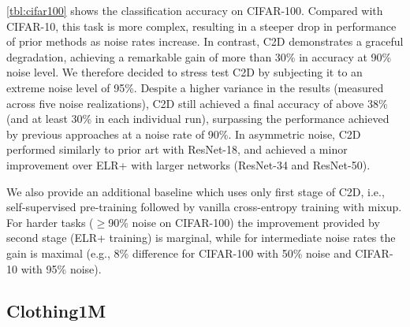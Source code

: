 \documentclass[10pt,twocolumn,letterpaper]{article}
\renewcommand{\cite}[1]{\citep{#1}}
\begin{document}
\cref{tbl:cifar100} shows the classification accuracy on CIFAR-100. Compared with CIFAR-10, this task is more complex, resulting in a steeper drop in performance of prior methods as noise rates increase. In contrast, C2D demonstrates a graceful degradation, achieving a remarkable gain of more than 30\% in accuracy at 90\% noise level. We therefore decided to stress test C2D by subjecting it to an extreme noise level of 95\%. Despite a higher variance in the results (measured across five noise realizations), C2D still achieved a final accuracy of above 38\% (and at least 30\% in each individual run), surpassing the performance achieved by previous approaches at a noise rate of 90\%. 
In asymmetric noise, C2D performed similarly to prior art with ResNet-18, and achieved a minor improvement over ELR+ \cite{liu2020earlylearning} with larger networks (ResNet-34 and ResNet-50).

We also provide an additional baseline which uses only first stage of C2D, i.e., self-supervised pre-training followed by vanilla cross-entropy training with mixup. For harder tasks ($\geqslant$90\% noise on CIFAR-100) the improvement provided by second stage (ELR+ training) is marginal, while for intermediate noise rates the gain is maximal (e.g., 8\% difference for CIFAR-100 with 50\% noise and CIFAR-10 with 95\% noise).

\subsection{Clothing1M}
\end{document}
